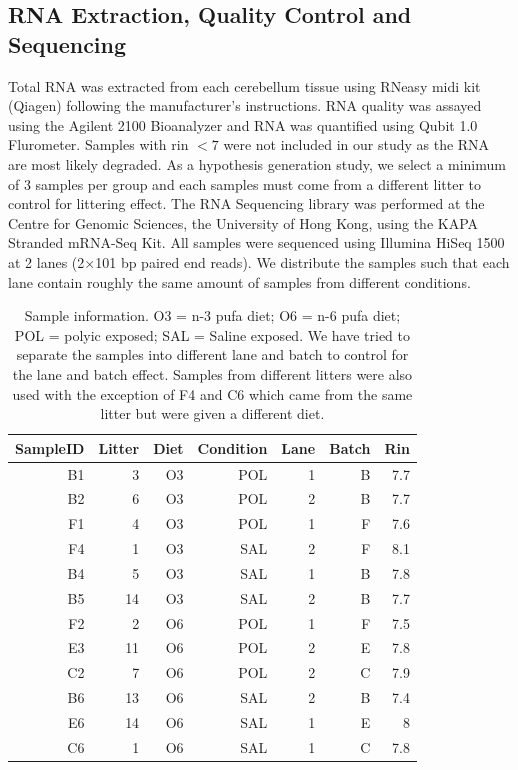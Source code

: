 \documentclass[12pt]{scrbook}
\begin{document}
\subsection{RNA Extraction, Quality Control and Sequencing}
Total RNA was extracted from each cerebellum tissue using RNeasy midi kit (Qiagen) following the manufacturer's instructions.
RNA quality was assayed using the Agilent 2100 Bioanalyzer and RNA was quantified using Qubit 1.0 Flurometer.
Samples with \gls{rin} $<7$ were not included in our study as the RNA are most likely degraded.
As a hypothesis generation study, we select a minimum of 3 samples per group and each samples must come from a different litter to control for littering effect.
The RNA Sequencing library was performed at the Centre for Genomic Sciences, the University of Hong Kong, using the KAPA Stranded mRNA-Seq Kit. 
All samples were sequenced using Illumina HiSeq 1500 at 2 lanes (2$\times$101 \gls{bp} paired end reads).
We distribute the samples such that each lane contain roughly the same amount of samples from different conditions.
\begin{table}
	\centering
	\begin{tabular}{rrrrrrr}
		\toprule
		SampleID & Litter & Diet & Condition & Lane & Batch & Rin\\
		\midrule
		B1&	3&	O3&	POL&	1&	B&	7.7\\
		B2&	6&	O3&	POL&	2&	B&	7.7\\
		F1&	4&	O3&	POL&	1&	F&	7.6\\
		F4&	1&	O3&	SAL&	2&	F&	8.1\\
		B4&	5&	O3&	SAL&	1&	B&	7.8\\
		B5&	14&	O3&	SAL&	2&	B&	7.7\\
		F2&	2&	O6&	POL&	1&	F&	7.5\\
		E3&	11&	O6&	POL&	2&	E&	7.8\\
		C2&	7&	O6&	POL&	2&	C&	7.9\\
		B6&	13&	O6&	SAL&	2&	B&	7.4\\
		E6&	14&	O6&	SAL&	1&	E&	8\\
		C6&	1&	O6&	SAL&	1&	C&	7.8\\
		\bottomrule
	\end{tabular}
	\caption[Sample Information]{
		Sample information.
		O3 = n-3 \gls{pufa} diet; O6 = n-6 \gls{pufa} diet; POL = \gls{polyic} exposed; SAL = Saline exposed.
		We have tried to separate the samples into different lane and batch to control for the lane and batch effect. 
		Samples from different litters were also used with the exception of F4 and C6 which came from the same litter but were given a different diet.
		\label{tab:sampleInfo}
	}
\end{table}
\end{document}
